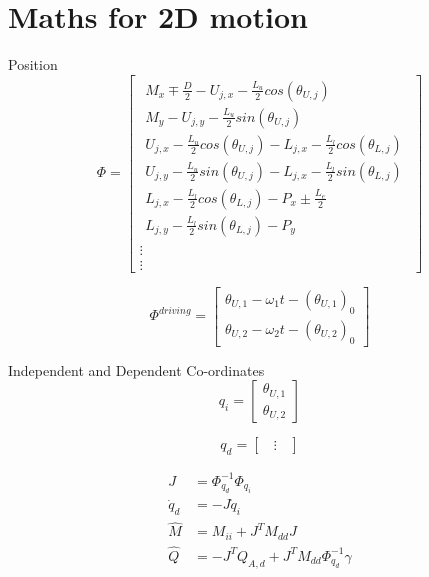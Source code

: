 \section{Maths for 2D motion}

Position
\begin{equation}
    \Phi=
    \begin{bmatrix}
    \begin{array}{l} %
    M_x\mp\frac{D}{2}-U_{j,x}-\frac{L_u}{2} cos(\theta_{U,j}) \\
    M_y-U_{j,y}-\frac{L_u}{2} sin(\theta_{U,j})\\
    U_{j,x}-\frac{L_u}{2}cos(\theta_{U,j})-L_{j,x}-\frac{L_l}{2}cos(\theta_{L,j}) \\
    U_{j,y}-\frac{L_u}{2}sin(\theta_{U,j})-L_{j,x}-\frac{L_l}{2}sin(\theta_{L,j})\\
    L_{j,x}-\frac{L_l}{2}cos(\theta_{L,j})-P_x \pm \frac{L_e}{2} \\
    L_{j,y}-\frac{L_l}{2}sin(\theta_{L,j})-P_y%
    \end{array}\\
    \vdots \\
    \vdots
    \end{bmatrix}
\end{equation}

\begin{equation}
    \Phi^{driving}=
    \begin{bmatrix}
    \theta_{U,1} - \omega_1 t - (\theta_{U,1})_0\\
    \theta_{U,2} - \omega_2 t - (\theta_{U,2})_0
    \end{bmatrix}
\end{equation}

Independent and Dependent Co-ordinates
\begin{equation}
    q_i=
    \begin{bmatrix}
    \theta_{U,1} \\
    \theta_{U,2}
    \end{bmatrix}
\end{equation}

\begin{equation}
    q_d=
    \begin{bmatrix}
    \; \; \vdots \; \;
    \end{bmatrix}
\end{equation}

\begin{align}
         J&=\Phi_{q_d}^{-1}\Phi_{q_i} \\
 \dot{q}_d&=-J\dot{q}_i\\
   \hat{M}&=M_{ii}+ J^T M_{dd}J\\
   \hat{Q}&=-J^T Q_{A,d}+J^T M_{dd}\Phi_{q_d}^{-1}\gamma
\end{align}

